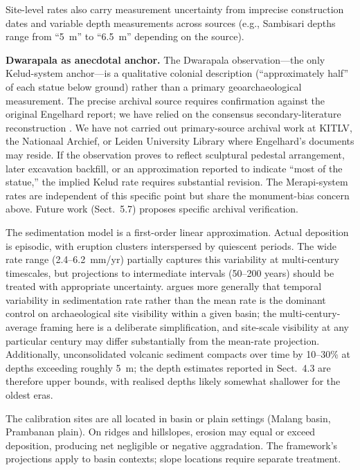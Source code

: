 \documentclass[12pt,a4paper]{article}
\begin{document}
Site-level rates also carry measurement uncertainty from imprecise construction dates and variable depth measurements across sources (e.g., Sambisari depths range from ``5~m'' to ``6.5~m'' depending on the source).

\textbf{Dwarapala as anecdotal anchor.} The Dwarapala observation---the only Kelud-system anchor---is a qualitative colonial description (``approximately half'' of each statue below ground) rather than a primary geoarchaeological measurement. The precise archival source requires confirmation against the original Engelhard report; we have relied on the consensus secondary-literature reconstruction \citep{kinney2003}. We have not carried out primary-source archival work at KITLV, the Nationaal Archief, or Leiden University Library where Engelhard's documents may reside. If the observation proves to reflect sculptural pedestal arrangement, later excavation backfill, or an approximation reported to indicate ``most of the statue,'' the implied Kelud rate requires substantial revision. The Merapi-system rates are independent of this specific point but share the monument-bias concern above. Future work (Sect.~5.7) proposes specific archival verification.

The sedimentation model is a first-order linear approximation. Actual deposition is episodic, with eruption clusters interspersed by quiescent periods. The wide rate range (2.4--6.2~mm/yr) partially captures this variability at multi-century timescales, but projections to intermediate intervals (50--200 years) should be treated with appropriate uncertainty. \citet{ferring1986} argues more generally that temporal variability in sedimentation rate rather than the mean rate is the dominant control on archaeological site visibility within a given basin; the multi-century-average framing here is a deliberate simplification, and site-scale visibility at any particular century may differ substantially from the mean-rate projection. Additionally, unconsolidated volcanic sediment compacts over time by 10--30\% at depths exceeding roughly 5~m; the depth estimates reported in Sect.~4.3 are therefore upper bounds, with realised depths likely somewhat shallower for the oldest eras.

The calibration sites are all located in basin or plain settings (Malang basin, Prambanan plain). On ridges and hillslopes, erosion may equal or exceed deposition, producing net negligible or negative aggradation. The framework's projections apply to basin contexts; slope locations require separate treatment.
\end{document}
